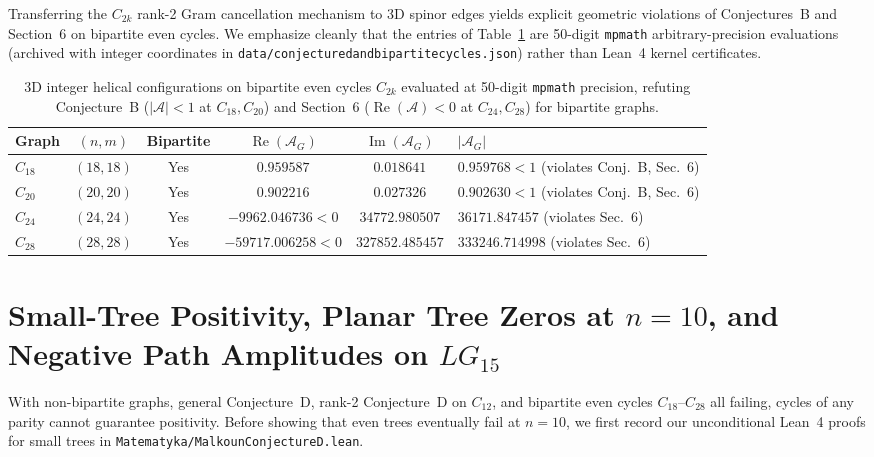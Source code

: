 \documentclass[11pt]{amsart}
\renewcommand{\_}{\origunderscore\penalty0\relax}
\theoremstyle{plain}
\theoremstyle{definition}
\theoremstyle{remark}
\DeclareMathOperator{\RePart}{Re}
\DeclareMathOperator{\ImPart}{Im}
\begin{document}
Transferring the $C_{2k}$ rank-2 Gram cancellation mechanism to 3D spinor edges yields explicit geometric violations of Conjectures~B and Section~6 on bipartite even cycles. We emphasize cleanly that the entries of Table~\ref{tab:even_cycles} are 50-digit \texttt{mpmath} arbitrary-precision evaluations (archived with integer coordinates in \texttt{data/conjecture\_d\_and\_bipartite\_cycles.json}) rather than Lean~4 kernel certificates.

\begin{table}[htbp]
\centering
\caption{3D integer helical configurations on bipartite even cycles $C_{2k}$ evaluated at 50-digit \texttt{mpmath} precision, refuting Conjecture~B ($|\mathcal{A}| < 1$ at $C_{18}, C_{20}$) and Section~6 ($\RePart(\mathcal{A}) < 0$ at $C_{24}, C_{28}$) for bipartite graphs.}
\label{tab:even_cycles}
\small
\begin{tabular}{@{}lccccl@{}}
\toprule
Graph & $(n, m)$ & Bipartite & $\RePart(\mathcal{A}_G)$ & $\ImPart(\mathcal{A}_G)$ & $|\mathcal{A}_G|$ \\
\midrule
$C_{18}$ & $(18, 18)$ & Yes & $0.959587$ & $0.018641$ & $0.959768 < 1$ (violates Conj.~B, Sec.~6) \\
$C_{20}$ & $(20, 20)$ & Yes & $0.902216$ & $0.027326$ & $0.902630 < 1$ (violates Conj.~B, Sec.~6) \\
$C_{24}$ & $(24, 24)$ & Yes & $-9962.046736 < 0$ & $34772.980507$ & $36171.847457$ (violates Sec.~6) \\
$C_{28}$ & $(28, 28)$ & Yes & $-59717.006258 < 0$ & $327852.485457$ & $333246.714998$ (violates Sec.~6) \\
\bottomrule
\end{tabular}
\end{table}

\section{Small-Tree Positivity, Planar Tree Zeros at $n = 10$, and Negative Path Amplitudes on $LG_{15}$}\label{sec:trees}

With non-bipartite graphs, general Conjecture~D, rank-2 Conjecture~D on $C_{12}$, and bipartite even cycles $C_{18}$--$C_{28}$ all failing, cycles of any parity cannot guarantee positivity. Before showing that even trees eventually fail at $n = 10$, we first record our unconditional Lean~4 proofs for small trees in \texttt{Matematyka/MalkounConjectureD.lean}.
\end{document}
